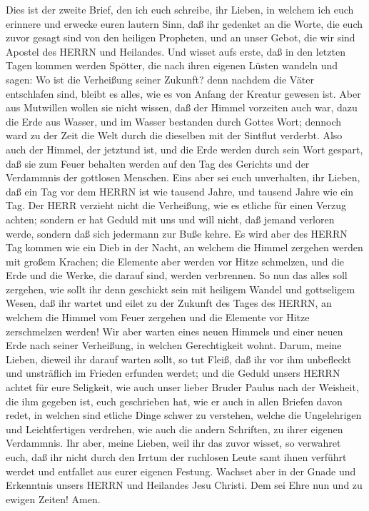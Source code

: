  Dies ist der zweite Brief, den ich euch schreibe, ihr
Lieben, in welchem ich euch erinnere und erwecke euren lautern Sinn,
 daß ihr gedenket an die Worte, die euch zuvor gesagt sind
von den heiligen Propheten, und an unser Gebot, die wir sind Apostel des
HERRN und Heilandes.  Und wisset aufs erste, daß in den
letzten Tagen kommen werden Spötter, die nach ihren eigenen Lüsten
wandeln  und sagen: Wo ist die Verheißung seiner Zukunft?
denn nachdem die Väter entschlafen sind, bleibt es alles, wie es von
Anfang der Kreatur gewesen ist.  Aber aus Mutwillen wollen
sie nicht wissen, daß der Himmel vorzeiten auch war, dazu die Erde aus
Wasser, und im Wasser bestanden durch Gottes Wort;  dennoch
ward zu der Zeit die Welt durch die dieselben mit der Sintflut verderbt.
 Also auch der Himmel, der jetztund ist, und die Erde werden
durch sein Wort gespart, daß sie zum Feuer behalten werden auf den Tag
des Gerichts und der Verdammnis der gottlosen Menschen. 
Eins aber sei euch unverhalten, ihr Lieben, daß ein Tag vor dem HERRN
ist wie tausend Jahre, und tausend Jahre wie ein Tag.  Der
HERR verzieht nicht die Verheißung, wie es etliche für einen Verzug
achten; sondern er hat Geduld mit uns und will nicht, daß jemand
verloren werde, sondern daß sich jedermann zur Buße kehre. 
Es wird aber des HERRN Tag kommen wie ein Dieb in der Nacht, an welchem
die Himmel zergehen werden mit großem Krachen; die Elemente aber werden
vor Hitze schmelzen, und die Erde und die Werke, die darauf sind, werden
verbrennen.  So nun das alles soll zergehen, wie sollt ihr
denn geschickt sein mit heiligem Wandel und gottseligem Wesen,
 daß ihr wartet und eilet zu der Zukunft des Tages des
HERRN, an welchem die Himmel vom Feuer zergehen und die Elemente vor
Hitze zerschmelzen werden!  Wir aber warten eines neuen
Himmels und einer neuen Erde nach seiner Verheißung, in welchen
Gerechtigkeit wohnt.  Darum, meine Lieben, dieweil ihr
darauf warten sollt, so tut Fleiß, daß ihr vor ihm unbefleckt und
unsträflich im Frieden erfunden werdet;  und die Geduld
unsers HERRN achtet für eure Seligkeit, wie auch unser lieber Bruder
Paulus nach der Weisheit, die ihm gegeben ist, euch geschrieben hat,
 wie er auch in allen Briefen davon redet, in welchen sind
etliche Dinge schwer zu verstehen, welche die Ungelehrigen und
Leichtfertigen verdrehen, wie auch die andern Schriften, zu ihrer
eigenen Verdammnis.  Ihr aber, meine Lieben, weil ihr das
zuvor wisset, so verwahret euch, daß ihr nicht durch den Irrtum der
ruchlosen Leute samt ihnen verführt werdet und entfallet aus eurer
eigenen Festung.  Wachset aber in der Gnade und Erkenntnis
unsers HERRN und Heilandes Jesu Christi. Dem sei Ehre nun und zu ewigen
Zeiten! Amen.
